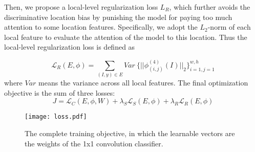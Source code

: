 \documentclass{article}
\begin{document}
Then, we propose a local-level regularization loss $L_R$, which further avoids the discriminative location bias by punishing the model for paying too much attention to some location features. Specifically, we adopt the $L_2$-norm of each local feature to evaluate the attention of the model to this location. Thus the local-level regularization loss is defined as

\begin{equation}
    \mathcal L_R(E, \phi) = \sum_{(I, y)\in E} Var\ \{ || \phi_{(i, j)}^{(4)}(I) ||_2 \}_{i=1, j=1}^{w, h}
\end{equation}
where $Var$ means the variance across all local features. The final optimization objective is the sum of three losses:
\begin{equation}
    \label{eq:l_all}
    J = \mathcal L_C(E, \phi, W) + \lambda_S \mathcal L_S(E, \phi) + \lambda_R \mathcal L_R(E, \phi)
\end{equation}



\begin{figure}[t]
	\begin{center}
	    \vspace{-10pt}
		\texttt{[image: loss.pdf]}
	\end{center}
	\vspace{-15pt}
	\caption{ The complete training objective, in which the learnable vectors are the weights of the 1x1 convolution classifier. }
	\label{fig:loss}
	\vspace{-8pt}
\end{figure}
\end{document}
